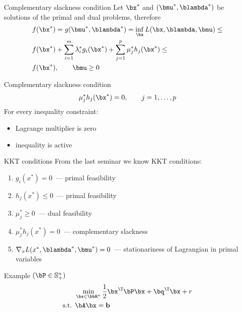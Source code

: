 \documentclass[12pt]{beamer}
\begin{document}
\begin{frame}{Complementary slackness condition}
Let $\bx^*$ and $(\bmu^*, \blambda^*)$ be solutions of the primal and dual problems, therefore
\begin{equation*}
\begin{split}
& f(\bx^*) = g(\bmu^*, \blambda^*) = \inf\limits_{\bx} L(\bx, \blambda, \bmu) \leq \\
& f(\bx^*) + \sum\limits_{i=1}^m\lambda^*_i g_i(\bx^*) + \sum\limits_{j=1}^p \mu^*_j h_j(\bx^*) \leq\\
& f(\bx^*), \qquad \bmu \geq 0 
\end{split}
\end{equation*}

\begin{block}{Complementary slackness condition}
\[
\mu^*_j h_j(\bx^*) = 0, \qquad j = 1,\ldots,p 
\]
For every inequality constraint:
\begin{itemize}
\item Lagrange multiplier is zero
\item inequality is active
\end{itemize} 
\end{block}
\end{frame}

\begin{frame}{KKT conditions}
From the last seminar we know KKT conditions: 
\begin{enumerate}
\item $g_i(x^*) = 0$~--- primal feasibility
\item $h_j(x^*) \leq 0$~--- primal feasibility
\item $ \mu^*_j \geq 0$~--- dual feasibility
\item $\mu^*_jh_j(x^*) = 0$~--- complementary slackness
\item $\nabla_x L(x^*, \blambda^*, \bmu^*) = 0$~--- stationariness of Lagrangian in primal variables
\end{enumerate}
Example $(\bP \in \mathbb{S}^n_+)$
\begin{equation*}
\begin{split}
& \min\limits_{\bx \in \bbR^n} \frac{1}{2}\bx^{\T}\bP\bx + \bq^{\T}\bx + r\\
\text{s.t. } & \bA\bx = \mathbf{b}
\end{split}
\end{equation*}
\end{frame}
\end{document}
